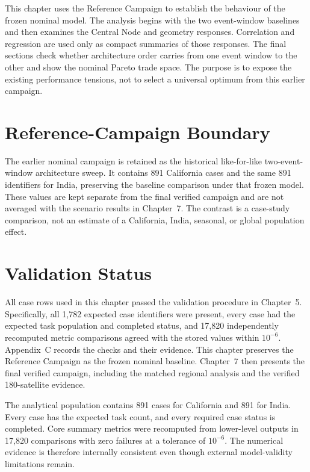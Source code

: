 This chapter uses the Reference Campaign to establish the behaviour of the frozen nominal model. The analysis begins with the two event-window baselines and then examines the Central Node and geometry responses. Correlation and regression are used only as compact summaries of those responses. The final sections check whether architecture order carries from one event window to the other and show the nominal Pareto trade space. The purpose is to expose the existing performance tensions, not to select a universal optimum from this earlier campaign.

\section{Reference-Campaign Boundary}

The earlier nominal campaign is retained as the historical like-for-like two-event-window architecture sweep. It contains 891 California cases and the same 891 identifiers for India, preserving the baseline comparison under that frozen model. These values are kept separate from the final verified campaign and are not averaged with the scenario results in Chapter~7. The contrast is a case-study comparison, not an estimate of a California, India, seasonal, or global population effect.

\section{Validation Status}

All case rows used in this chapter passed the validation procedure in Chapter~5. Specifically, all 1,782 expected case identifiers were present, every case had the expected task population and completed status, and 17,820 independently recomputed metric comparisons agreed with the stored values within $10^{-6}$. Appendix~C records the checks and their evidence. This chapter preserves the Reference Campaign as the frozen nominal baseline. Chapter~7 then presents the final verified campaign, including the matched regional analysis and the verified 180-satellite evidence.

The analytical population contains 891 cases for California and 891 for India. Every case has the expected task count, and every required case status is completed. Core summary metrics were recomputed from lower-level outputs in 17,820 comparisons with zero failures at a tolerance of $10^{-6}$. The numerical evidence is therefore internally consistent even though external model-validity limitations remain.

